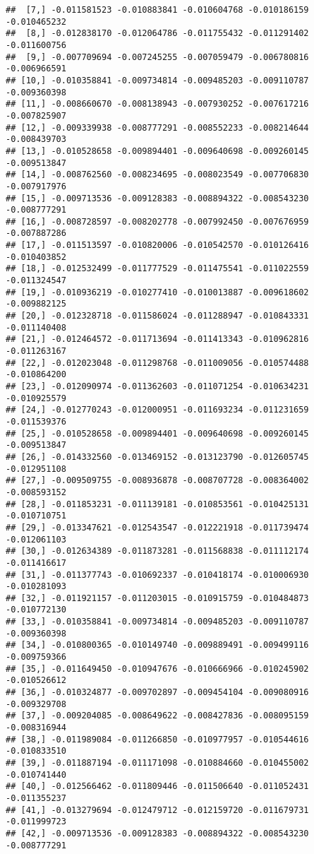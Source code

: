 \documentclass[
]{article}
\begin{document}
\begin{verbatim}
##  [7,] -0.011581523 -0.010883841 -0.010604768 -0.010186159 -0.010465232
##  [8,] -0.012838170 -0.012064786 -0.011755432 -0.011291402 -0.011600756
##  [9,] -0.007709694 -0.007245255 -0.007059479 -0.006780816 -0.006966591
## [10,] -0.010358841 -0.009734814 -0.009485203 -0.009110787 -0.009360398
## [11,] -0.008660670 -0.008138943 -0.007930252 -0.007617216 -0.007825907
## [12,] -0.009339938 -0.008777291 -0.008552233 -0.008214644 -0.008439703
## [13,] -0.010528658 -0.009894401 -0.009640698 -0.009260145 -0.009513847
## [14,] -0.008762560 -0.008234695 -0.008023549 -0.007706830 -0.007917976
## [15,] -0.009713536 -0.009128383 -0.008894322 -0.008543230 -0.008777291
## [16,] -0.008728597 -0.008202778 -0.007992450 -0.007676959 -0.007887286
## [17,] -0.011513597 -0.010820006 -0.010542570 -0.010126416 -0.010403852
## [18,] -0.012532499 -0.011777529 -0.011475541 -0.011022559 -0.011324547
## [19,] -0.010936219 -0.010277410 -0.010013887 -0.009618602 -0.009882125
## [20,] -0.012328718 -0.011586024 -0.011288947 -0.010843331 -0.011140408
## [21,] -0.012464572 -0.011713694 -0.011413343 -0.010962816 -0.011263167
## [22,] -0.012023048 -0.011298768 -0.011009056 -0.010574488 -0.010864200
## [23,] -0.012090974 -0.011362603 -0.011071254 -0.010634231 -0.010925579
## [24,] -0.012770243 -0.012000951 -0.011693234 -0.011231659 -0.011539376
## [25,] -0.010528658 -0.009894401 -0.009640698 -0.009260145 -0.009513847
## [26,] -0.014332560 -0.013469152 -0.013123790 -0.012605745 -0.012951108
## [27,] -0.009509755 -0.008936878 -0.008707728 -0.008364002 -0.008593152
## [28,] -0.011853231 -0.011139181 -0.010853561 -0.010425131 -0.010710751
## [29,] -0.013347621 -0.012543547 -0.012221918 -0.011739474 -0.012061103
## [30,] -0.012634389 -0.011873281 -0.011568838 -0.011112174 -0.011416617
## [31,] -0.011377743 -0.010692337 -0.010418174 -0.010006930 -0.010281093
## [32,] -0.011921157 -0.011203015 -0.010915759 -0.010484873 -0.010772130
## [33,] -0.010358841 -0.009734814 -0.009485203 -0.009110787 -0.009360398
## [34,] -0.010800365 -0.010149740 -0.009889491 -0.009499116 -0.009759366
## [35,] -0.011649450 -0.010947676 -0.010666966 -0.010245902 -0.010526612
## [36,] -0.010324877 -0.009702897 -0.009454104 -0.009080916 -0.009329708
## [37,] -0.009204085 -0.008649622 -0.008427836 -0.008095159 -0.008316944
## [38,] -0.011989084 -0.011266850 -0.010977957 -0.010544616 -0.010833510
## [39,] -0.011887194 -0.011171098 -0.010884660 -0.010455002 -0.010741440
## [40,] -0.012566462 -0.011809446 -0.011506640 -0.011052431 -0.011355237
## [41,] -0.013279694 -0.012479712 -0.012159720 -0.011679731 -0.011999723
## [42,] -0.009713536 -0.009128383 -0.008894322 -0.008543230 -0.008777291

\end{verbatim}
\end{document}

